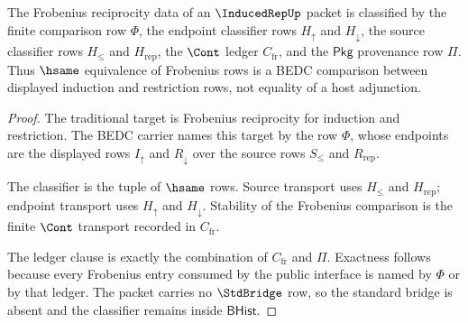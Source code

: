 \begin{theorem}
\label{thm:inducedrep-frobenius-reciprocity-classifier}
The Frobenius reciprocity data of an $\InducedRepUp$ packet is classified by
the finite comparison row $\Phi$, the endpoint classifier rows
$H_{\uparrow}$ and $H_{\downarrow}$, the source classifier rows $H_{\leq}$
and $H_{\mathrm{rep}}$, the $\Cont$ ledger $C_{\mathrm{fr}}$, and the
$\mathsf{Pkg}$ provenance row $\Pi$. Thus $\hsame$ equivalence of Frobenius
rows is a BEDC comparison between displayed induction and restriction rows,
not equality of a host adjunction.
\end{theorem}
\begin{proof}
The traditional target is Frobenius reciprocity for induction and
restriction. The BEDC carrier names this target by the row $\Phi$, whose
endpoints are the displayed rows $I_{\uparrow}$ and $R_{\downarrow}$ over the
source rows $S_{\leq}$ and $R_{\mathrm{rep}}$.

The classifier is the tuple of $\hsame$ rows. Source transport uses
$H_{\leq}$ and $H_{\mathrm{rep}}$; endpoint transport uses $H_{\uparrow}$ and
$H_{\downarrow}$. Stability of the Frobenius comparison is the finite
$\Cont$ transport recorded in $C_{\mathrm{fr}}$.

The ledger clause is exactly the combination of $C_{\mathrm{fr}}$ and
$\Pi$. Exactness follows because every Frobenius entry consumed by the public
interface is named by $\Phi$ or by that ledger. The packet carries no
$\StdBridge$ row, so the standard bridge is absent and the classifier remains
inside $\mathsf{BHist}$.
\end{proof}


